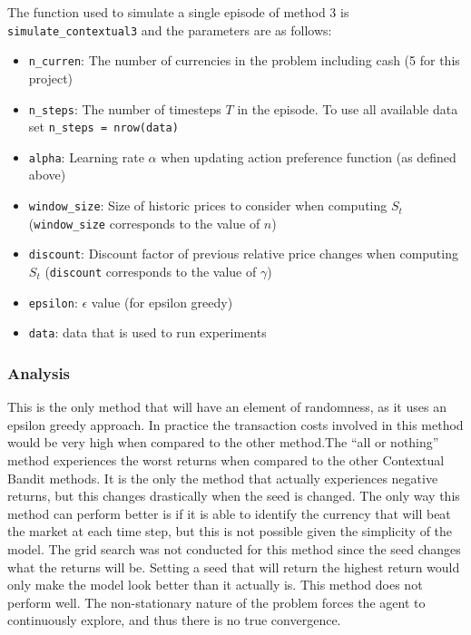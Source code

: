 \documentclass[a4paper,12pt]{article}
\newcommand{\code}[1]{\texttt{#1}}
\begin{document}
The function used to simulate a single episode of method 3 is \code{simulate\_contextual3} and the parameters are as follows:
\begin{itemize}
  \item \code{n\_curren}: The number of currencies in the problem including cash (5 for this project)
  \item \code{n\_steps}: The number of timesteps $T$ in the episode. To use all available data set \code{n\_steps = nrow(data)}
  \item \code{alpha}: Learning rate $\alpha$ when updating action preference function (as defined above)
  \item \code{window\_size}: Size of historic prices to consider when computing $S_t$ (\code{window\_size} corresponds to the value of $n$)
  \item \code{discount}: Discount factor of previous relative price changes when computing $S_t$ (\code{discount} corresponds to the value of $\gamma$)
  \item \code{epsilon}: $\epsilon$ value (for epsilon greedy)
  \item \code{data}: data that is used to run experiments
\end{itemize}

\newpage

\subsubsection{Analysis}
This is the only method that will have an element of randomness, as it uses an epsilon greedy approach. In practice the transaction costs involved in this method would be very high when compared to the other method.The “all or nothing” method  experiences the worst returns when compared to the other Contextual Bandit methods. It is the only the method that actually experiences negative returns, but this changes drastically when the seed is changed. The only way this method can perform better is if it is able to identify the currency that will beat the market at each time step, but this is not possible given the simplicity of the model.
The grid search was not conducted for this method since the seed changes what the returns will be. Setting a seed that will return the highest return would only make the model look better than it actually is.
This method does not perform well. The non-stationary nature of the problem forces the agent to continuously explore, and thus there is no true convergence. 
\end{document}
